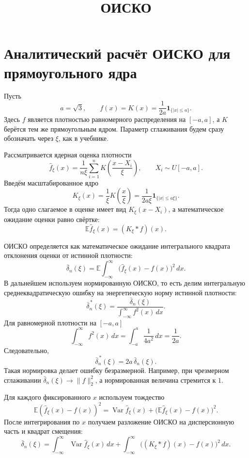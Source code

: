 \documentclass[12pt,a4paper]{article}
\begin{document}
\title{ОИСКО}
\author{}
\date{}
\maketitle

\section*{Аналитический расчёт ОИСКО для прямоугольного ядра}

Пусть
\[
a=\sqrt{3},\qquad
f(x)=K(x)=\frac{1}{2a}\mathbf{1}_{\{|x|\le a\}}.
\]
Здесь $f$ является плотностью равномерного распределения на $[-a,a]$, а
$K$ берётся тем же прямоугольным ядром. Параметр сглаживания будем сразу
обозначать через $\xi$, как в учебнике.

Рассматривается ядерная оценка плотности
\[
\widehat f_\xi(x)=\frac{1}{n\xi}\sum_{i=1}^n
K\left(\frac{x-X_i}{\xi}\right),
\qquad X_i\sim U[-a,a].
\]
Введём масштабированное ядро
\[
K_\xi(x)=\frac{1}{\xi}K\left(\frac{x}{\xi}\right)
=\frac{1}{2a\xi}\mathbf{1}_{\{|x|\le a\xi\}}.
\]
Тогда одно слагаемое в оценке имеет вид $K_\xi(x-X_i)$, а математическое
ожидание оценки равно свёртке:
\[
\mathbb E\widehat f_\xi(x)=(K_\xi*f)(x).
\]

ОИСКО определяется как математическое ожидание интегрального квадрата
отклонения оценки от истинной плотности:
\[
\bar{\delta}_n(\xi)
=\mathbb E\int_{-\infty}^{\infty}
\bigl(\widehat f_\xi(x)-f(x)\bigr)^2\,dx.
\]
В дальнейшем используем нормированную ОИСКО, то есть делим интегральную
среднеквадратическую ошибку на энергетическую норму истинной плотности:
\[
\bar{\delta}^{\,*}_n(\xi)
=
\frac{\bar{\delta}_n(\xi)}
{\displaystyle\int_{-\infty}^{\infty} f^2(x)\,dx}.
\]
Для равномерной плотности на $[-a,a]$
\[
\int_{-\infty}^{\infty} f^2(x)\,dx
=\int_{-a}^{a}\frac{1}{4a^2}\,dx
=\frac{1}{2a}.
\]
Следовательно,
\[
\bar{\delta}^{\,*}_n(\xi)=2a\,\bar{\delta}_n(\xi).
\]
Такая нормировка делает ошибку безразмерной. Например, при чрезмерном
сглаживании $\bar{\delta}_n(\xi)\to\|f\|_2^2$, а нормированная величина
стремится к $1$.

Для каждого фиксированного $x$ используем тождество
\[
\mathbb E(\widehat f_\xi(x)-f(x))^2
=\operatorname{Var}\widehat f_\xi(x)
+\bigl(\mathbb E\widehat f_\xi(x)-f(x)\bigr)^2.
\]
После интегрирования по $x$ получаем разложение ОИСКО на дисперсионную
часть и квадрат смещения:
\[
\bar{\delta}_n(\xi)
=\int_{-\infty}^{\infty}\operatorname{Var}\widehat f_\xi(x)\,dx
+\int_{-\infty}^{\infty}
\bigl((K_\xi*f)(x)-f(x)\bigr)^2\,dx.
\]
\end{document}
